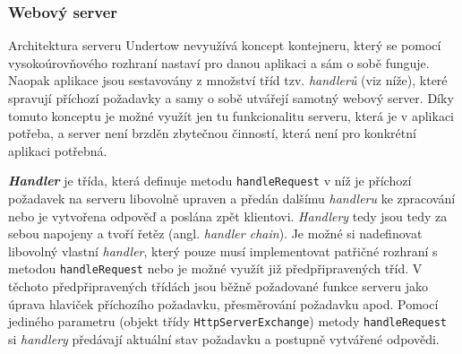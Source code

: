             \subsubsection{Webový server}
                Architektura serveru Undertow nevyužívá koncept kontejneru, který se pomocí vysokoúrovňového rozhraní nastaví 
                pro danou aplikaci a sám o sobě funguje. Naopak aplikace jsou sestavovány z množství tříd tzv. \emph{handlerů} 
                (viz níže), které spravují příchozí požadavky a samy o sobě utvářejí samotný webový server. 
                Díky tomuto konceptu je možné využít jen tu funkcionalitu serveru, která je v aplikaci potřeba, a server
                není brzděn zbytečnou činností, která není pro konkrétní aplikaci potřebná. 

                \textbf{\emph{Handler}} je třída, která definuje metodu \texttt{handleRequest} v níž
                je příchozí požadavek na serveru libovolně upraven a předán dalšímu \emph{handleru} ke zpracování nebo je vytvořena odpověď 
                a poslána zpět klientovi. \emph{Handlery} tedy jsou tedy za sebou napojeny a tvoří řetěz (angl. \emph{handler chain}).
                Je možné si nadefinovat libovolný vlastní \emph{handler}, který pouze musí implementovat patřičné rozhraní s metodou 
                \texttt{handleRequest} nebo je možné využít již předpřipravených tříd. V těchoto předpřipravených třídách
                jsou běžně požadované funkce serveru jako úprava hlaviček příchozího požadavku, přesměrování požadavku apod.
                Pomocí jediného parametru (objekt třídy \texttt{HttpServerExchange}) metody \texttt{handleRequest} 
                si \emph{handlery} předávají aktuální stav požadavku a postupně vytvářené odpovědi.

                                



